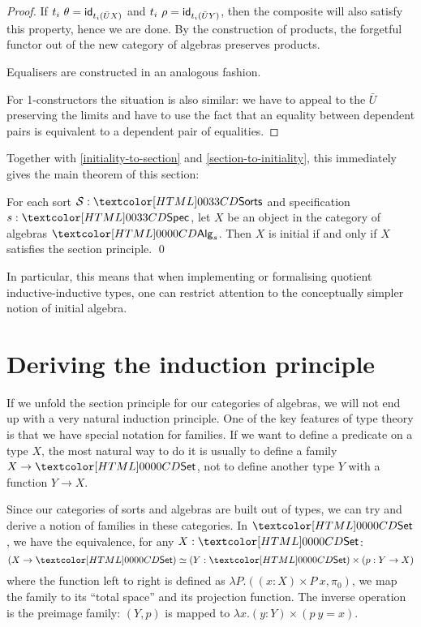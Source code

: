 \begin{proof}
  If $t_i\ \theta = \mathsf{id}_{t_i (\bar{U}X)}$ and
  $t_i\ \rho = \mathsf{id}_{t_i (\bar{U}Y)}$, then the composite will also
  satisfy this property, hence we are done. By the construction of
  products, the forgetful functor out of the new category of algebras
  preserves products.

  Equalisers are constructed in an analogous fashion.

  For 1-constructors the situation is also similar: we have to appeal
  to the $\bar{U}$ preserving the limits and have to use the fact that
  an equality between dependent pairs is equivalent to a dependent
  pair of equalities.
\end{proof}

Together with \cref{initiality-to-section} and
\cref{section-to-initiality}, this immediately gives the main theorem
of this section:

\begin{theorem}
\label{thm:main}
  For each sort $\Ss : \sortsty$ and specification $s : \specty$, let $X$
  be an object in the category of algebras $\Alg_s$. Then $X$ is
  initial if and only if $X$ satisfies the section principle. \qed
\end{theorem}

In particular, this means that when implementing or formalising
quotient inductive-inductive types, one can restrict attention to the
conceptually simpler notion of initial algebra.

\section{Deriving the induction principle}

If we unfold the section principle for our categories of algebras, we
will not end up with a very natural induction principle. One of the
key features of type theory is that we have special notation for
families. If we want to define a predicate on a type $X$, the most 
natural way to do it is usually to define a family $X \to \Set$, not
to define another type $Y$ with a function $Y \to X$. 

Since our categories of sorts and algebras are built out of types, we
can try and derive a notion of families in these categories. In
$\Set$, we have the equivalence, for any $X : \Set$:
$$
(X \to \Set) \simeq (Y : \Set) \times (p : Y \to X)
$$
where the function left to right is defined as
$\lambda P . ((x : X) \times P\ x , \pi_0)$, \ie we map the family to
its ``total space'' and its projection function. The inverse operation
is the preimage family: $(Y,p)$ is mapped to
$\lambda x . (y : Y) \times (p\ y = x)$. 

